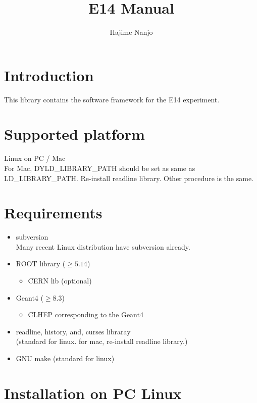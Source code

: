 \documentclass[a4paper,12pt]{article}
\begin{document}
\title{E14 Manual}
\author{Hajime Nanjo}
\maketitle

 \section{Introduction}
  This library contains the software framework for the E14 experiment.
 \section{Supported platform}
  Linux on PC / Mac\\
  For Mac, DYLD\_LIBRARY\_PATH should be set as same as LD\_LIBRARY\_PATH.
  Re-install readline library. Other procedure is the same.
 \section{Requirements}
  \begin{itemize}
   \item subversion\\
         Many recent Linux distribution have subversion already.
   \item ROOT library ($\ge 5.14$)
	 \begin{itemize}
	  \item  CERN lib (optional)
	 \end{itemize}
   \item Geant4 ($\ge 8.3$)
	 \begin{itemize}
	  \item CLHEP corresponding to the Geant4
	 \end{itemize}
   \item readline, history, and, curses libraray\\
          (standard for linux. for mac, re-install readline library.) 
   \item GNU make (standard for linux) 
  \end{itemize}

 \section{Installation on PC Linux}
\end{document}
